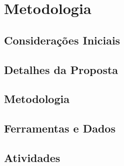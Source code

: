 \chapter{Metodologia}
\label{cap-metodologia}


\section{Considerações Iniciais}

\section{Detalhes da Proposta}

\section{Metodologia}

\section{Ferramentas e Dados}

\section{Atividades}
%
